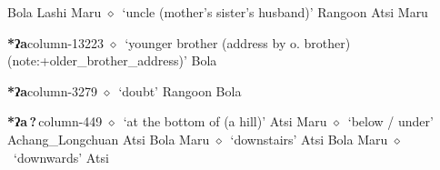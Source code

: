          Bola 
\hspace{1ex}
         Lashi 
\hspace{1ex}
         Maru 
\hspace{1ex}
         $\diamond$~`uncle (mother's sister's husband)'
         Rangoon 
\hspace{1ex}
         Atsi 
\hspace{1ex}
         Maru 
  \item {\footnotesize \textbf{*ʔa}}{\tiny column-13223}
         $\diamond$~`younger brother (address by o. brother) (note:+older_brother_address)'
         Bola 
  \item {\footnotesize \textbf{*ʔa}}{\tiny column-3279}
         $\diamond$~`doubt'
         Rangoon 
\hspace{1ex}
         Bola 
  \item {\footnotesize \textbf{*ʔa\,?\,}}{\tiny column-449}
         $\diamond$~`at the bottom of (a hill)'
         Atsi 
\hspace{1ex}
         Maru 
\hspace{1ex}
         $\diamond$~`below / under'
         Achang\_Longchuan 
\hspace{1ex}
         Atsi 
\hspace{1ex}
         Bola 
\hspace{1ex}
         Maru 
\hspace{1ex}
         $\diamond$~`downstairs'
         Atsi 
\hspace{1ex}
         Bola 
\hspace{1ex}
         Maru 
\hspace{1ex}
         $\diamond$~`downwards'
         Atsi 
\hspace{1ex}
